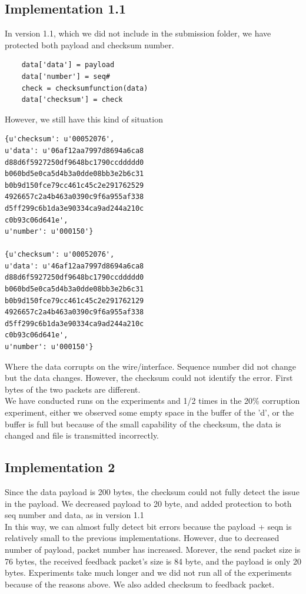 \documentclass[12pt,journal,compsoc]{IEEEtran}
\begin{document}
\subsection{Implementation 1.1}
In version 1.1, which we did not include in the submission folder, we have protected both payload and checksum number.\\
\begin{verbatim}
	data['data'] = payload
	data['number'] = seq#
	check = checksumfunction(data)
	data['checksum'] = check
\end{verbatim}
However, we still have this kind of situation\\
\begin{verbatim}
{u'checksum': u'00052076', 
u'data': u'06af12aa7997d8694a6ca8
d88d6f5927250df9648bc1790ccddddd0
b060bd5e0ca5d4b3a0dde08bb3e2b6c31
b0b9d150fce79cc461c45c2e291762529
4926657c2a4b463a0390c9f6a955af338
d5ff299c6b1da3e90334ca9ad244a210c
c0b93c06d641e', 
u'number': u'000150'}

{u'checksum': u'00052076',
u'data': u'46af12aa7997d8694a6ca8
d88d6f5927250df9648bc1790ccddddd0
b060bd5e0ca5d4b3a0dde08bb3e2b6c31
b0b9d150fce79cc461c45c2e291762129
4926657c2a4b463a0390c9f6a955af338
d5ff299c6b1da3e90334ca9ad244a210c
c0b93c06d641e', 
u'number': u'000150'}
\end{verbatim}
Where the data corrupts on the wire/interface. Sequence number did not change but the data changes. However, the checksum could not identify the error. First bytes of the two packets are different.\\
We have conducted runs on the experiments and 1/2 times in the 20\% corruption experiment, either we observed some empty space in the buffer of the 'd', or the buffer is full but because of the small capability of the checksum, the data is changed and file is transmitted incorrectly.
\subsection{Implementation 2}
Since the data payload is 200 bytes, the checksum could not fully detect the issue in the payload. We decreased payload to 20 byte, and added protection to both seq number and data, as in version 1.1\\
In this way, we can almost fully detect bit errors because the payload + seqn is relatively small to the previous implementations. However, due to decreased number of payload, packet number has increased. Morever, the send packet size is 76 bytes, the received feedback packet's size is 84 byte, and the payload is only 20 bytes. Experiments take much longer and we did not run all of the experiments because of the reasons above. We also added checksum to feedback packet.\\
\end{document}
